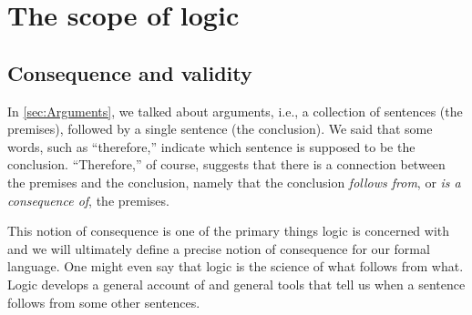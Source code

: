 \begin{practiceproblems}
\begin{problemslist}
\end{problemslist}

\end{practiceproblems}

\chapter{The scope of logic}
\label{sec:Valid}




\section{Consequence and validity}

In \cref{sec:Arguments}, we talked about arguments, i.e., a collection of sentences (the premises), followed by a single sentence (the conclusion). We said that some words, such as ``therefore,'' indicate which sentence is supposed to be the conclusion. ``Therefore,'' of course, suggests that there is a connection between the premises and the conclusion, namely that the conclusion \emph{follows from}, or \emph{is a consequence of}, the premises.

This notion of consequence is one of the primary things logic is concerned with and we will ultimately define a precise notion of consequence for our formal language. One might even say that logic is the science of what follows from what.  Logic develops a general account of and general tools that tell us when a sentence follows from some other sentences.

